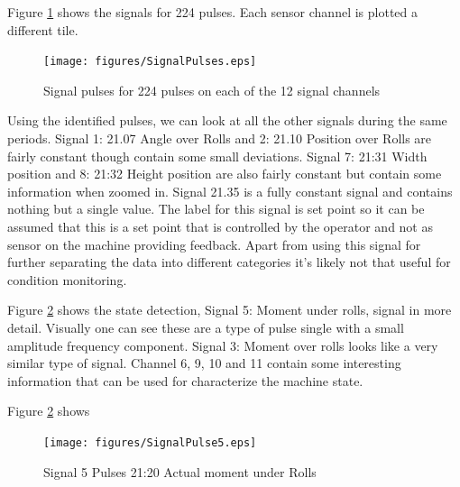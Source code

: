 \documentclass[]{article}
\begin{document}
Figure \ref{fig:SignalPulses} shows the signals for 224 pulses. Each sensor channel is plotted a different tile. 
\begin{figure}[H]
    \centering
    \texttt{[image: figures/SignalPulses.eps]}
    \caption{Signal pulses for 224 pulses on each of the 12 signal channels}
    \label{fig:SignalPulses}
\end{figure}

Using the identified pulses, we can look at all the other signals during the same periods. Signal 1: 21.07 Angle over Rolls and 2: 21.10 Position over Rolls are fairly constant though contain some small deviations. Signal 7: 21:31 Width position and  8: 21:32 Height position are also fairly constant but contain some information when zoomed in. Signal 21.35 is a fully constant signal and contains nothing but a single value. The label for this signal is set point so it can be assumed that this is a set point that is controlled by the operator and not as sensor on the machine providing feedback. Apart from using this signal for further separating the data into different categories it's likely not that useful for condition monitoring.

Figure \ref{fig:SignalPulse5} shows the state detection, Signal 5: Moment under rolls, signal in more detail. Visually one can see these are a type of pulse single with a small amplitude frequency component. Signal 3: Moment over rolls looks like a very similar type of signal. Channel 6, 9, 10 and 11 contain some interesting information that can be used for characterize the machine state.

 
 


Figure \ref{fig:SignalPulse5} shows 
\begin{figure}[H]
    \centering
    \texttt{[image: figures/SignalPulse5.eps]}
    \caption{Signal 5 Pulses 21:20 Actual moment under Rolls}
    \label{fig:SignalPulse5}
\end{figure}
\end{document}
